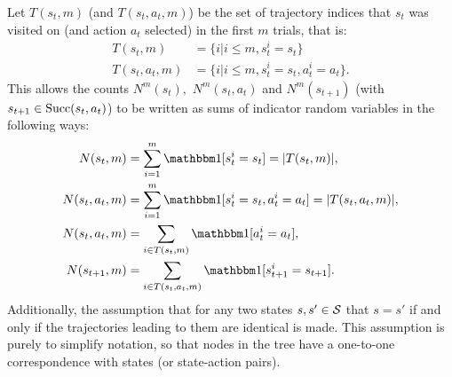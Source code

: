         Let $T(s_t,m)$ (and $T(s_t,a_t,m)$) be the set of trajectory indices that $s_t$ was visited on (and action $a_t$ selected) in the first $m$ trials, that is: 
        \begin{align}
            T(s_t,m) &= \{i | i\leq m, s^i_t = s_t \} \\
            T(s_t,a_t,m) &= \{i | i\leq m, s^i_t = s_t, a^i_t = a_t \}.
        \end{align}
        This allows the counts $N^m(s_t),$ $N^m(s_t,a_t)$ and $N^m(s_{t+1})$ (with $s_{t+1}\in{\textnormal{Succ}(s_t,a_t)}$) to be written as sums of indicator random variables in the following ways:
        \begin{align}
            N(s_t,m) &= \sum_{i=1}^m \one[s^i_t=s_t] = |T(s_t,m)|, \\
            N(s_t,a_t,m) &= \sum_{i=1}^m \one[s^i_t=s_t,a^i_t=a_t] = |T(s_t,a_t,m)|, \\ 
            N(s_t,a_t,m) &= \sum_{i\in T(s_t,m)} \one[a^i_t = a_t], \label{appeq:nsa_sum} \\
            N(s_{t+1},m) &= \sum_{i\in T(s_t,a_t,m)} \one[s^i_{t+1} = s_{t+1}]. \label{appeq:ns_sum}
        \end{align}
        Additionally, the assumption that for any two states $s,s'\in\mathcal{S}$ that $s=s'$ if and only if the trajectories leading to them are identical is made. This assumption is purely to simplify notation, so that nodes in the tree have a one-to-one correspondence with states (or state-action pairs). 









